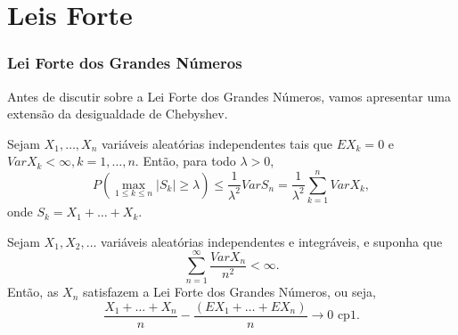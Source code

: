 %
%
%

\section{Leis Forte}
\begin{frame}
\frametitle{\textbf{Lei Forte dos Grandes Números}}

Antes de discutir sobre  a Lei Forte dos Grandes Números, vamos
apresentar uma extensão da desigualdade de
Chebyshev.

\begin{lema}
Sejam $X_1,\ldots,X_n$ variáveis aleatórias independentes tais que
$EX_k=0$ e $Var X_k<\infty,k=1,\ldots,n$. Então, para todo
$\lambda>0$,
$$P(\max_{1\leq k\leq n}|S_k|\geq \lambda)\leq \frac{1}{\lambda^2}Var S_n=\frac{1}{\lambda^2}\sum_{k=1}^{n}Var X_k,$$
onde $S_k=X_1+\ldots+X_k$.
\end{lema}


\begin{teo}
	Sejam $X_1,X_2,\ldots$ variáveis aleatórias independentes e
	integráveis, e suponha que
	$$\sum_{n=1}^{\infty}\frac{Var X_n}{n^2}<\infty.$$
	Então, as $X_n$ satisfazem a Lei Forte dos Grandes Números, ou seja,
	$$\frac{X_1+\ldots+X_n}{n}-\frac{(EX_1+\ldots+EX_n)}{n}\rightarrow 0\mbox{ cp1.}$$
\end{teo}
\end{frame}

